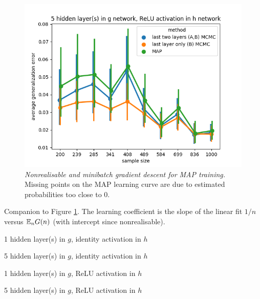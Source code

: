 \documentclass{article} %
\begin{document}
\begin{figure}[t!]
\begin{center}
		\includegraphics[scale=0.35]{taskid7.png}
	\end{center}
	\caption{\textit{Nonrealisable and minibatch gradient descent for MAP training.} Missing points on the MAP learning curve are due to estimated probabilities too close to 0.}
	\label{fig:avg_gen_err_minibatch_nonrealisable}
\end{figure}


\begin{table}[h!]%
	\centering
	\caption{Companion to Figure \ref{fig:avg_gen_err_minibatch_nonrealisable}. The learning coefficient is the slope of the linear fit $1/n$ versus $\mathbb{E}_n G(n)$ (with intercept since nonrealisable).}%
	\label{table::avg_gen_err_minibatch_nonrealisable}%
	\begin{tiny}
	\begin{subtable}[t]{2.5in}
		\caption{1 hidden layer(s) in $g$, identity activation in $h$}		
	\end{subtable}
	\quad
	\begin{subtable}[t]{2.5in}
		\caption{5 hidden layer(s) in $g$, identity activation in $h$}		
	\end{subtable}
	\quad
	\begin{subtable}[t]{2.5in}
		\caption{1 hidden layer(s) in $g$, ReLU activation in $h$}		
	\end{subtable}
	\quad
	\begin{subtable}[t]{2.5in}
		\caption{5 hidden layer(s) in $g$, ReLU activation in $h$}		
	\end{subtable}
	\end{tiny}
\end{table}
\end{document}
